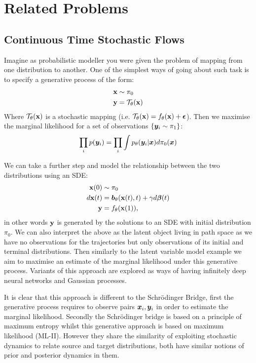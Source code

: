 \documentclass[a4paper,12pt,twoside,openright]{report}
\theoremstyle{definition}
\begin{document}
\chapter{Related Problems}
\section{Continuous Time Stochastic Flows}

Imagine as probabilistic modeller you were given the problem of mapping from one distribution to another. One of the simplest ways of going about such task is to specify a generative process of the form:
\begin{align*}
    {\mathbf{x}} &\sim \pi_0 \\
    {\mathbf{y}} &= {\mathcal{T}}_{\theta}({\mathbf{x}})
\end{align*}
Where ${\mathcal{T}}_{\theta}({\mathbf{x}})$  is a stochastic mapping (i.e. ${\mathcal{T}}_{\theta}({\mathbf{x}}) = f_{\theta}({\mathbf{x}}) + {\bm{\epsilon}}$). Then we maximise the marginal likelihood for a set of observations $\{{\bm{y}}_i \sim \pi_1 \}$:
\begin{align*}
    \prod_i p({\bm{y}}_i) = \prod_i \int p_{\theta}({\bm{y}}_i | {\bm{x}}) d\pi_0({\bm{x}})
\end{align*}

We can take a further step and model the relationship between the two distributions using an SDE:
\begin{align*}
    {\mathbf{x}}(0) &\sim \pi_0 \\
    d{\mathbf{x}}(t) &= {\bm{b}}_{\theta}({\mathbf{x}}(t), t) + \gamma d{\bm{\beta}}(t) \\
    {\mathbf{y}} &= f_{\theta}({\mathbf{x}}(1)),
\end{align*}
in other words ${\mathbf{y}}$ is generated by the solutions to an SDE with initial distribution $\pi_0$. We can also interpret the above as the latent object living in path space as we have no observations for the trajectories  but only observations of its initial and terminal distributions. Then similarly to the latent variable model example we aim to maximise an estimate of the marginal likelihood under this generative process. Variants of this approach are explored \citep{lahdesmakideep, tzen2019neural} as ways of having infinitely deep neural networks and Gaussian processes.

It is clear that this approach is different to the Schrödinger Bridge, first the generative process requires to observe pairs ${\bm{x}}_i, {\bm{y}}_i$ in order to estimate the marginal likelihood. Secondly the Schrödinger bridge is based on a principle of maximum entropy whilst this generative approach is based on maximum likelihood (ML-II).  However they share the similarity of exploiting stochastic dynamics to relate source and target distributions, both have similar notions of prior and posterior dynamics in them.
\end{document}
